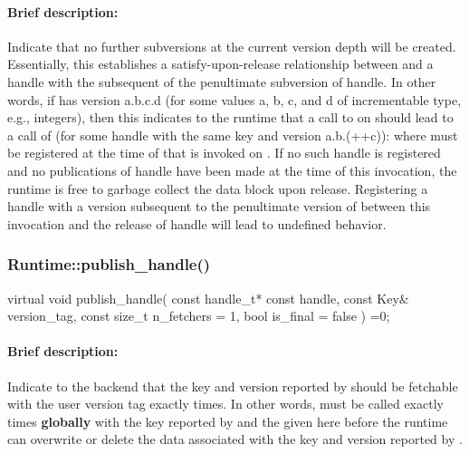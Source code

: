 \paragraph{Brief description:} Indicate that no further subversions at the current version depth will be created.
     Essentially, this establishes a satisfy-upon-release relationship between  and a handle
      with the subsequent of the penultimate subversion of handle.  In other words, if  has
       version a.b.c.d (for some values a, b, c, and d of incrementable type, e.g., integers), then this
      indicates to the runtime that a call to  on  should lead to a
       call of (for some handle  with the same key and version a.b.(++c)):
       where  must be registered at the time of that  is invoked
       on .  If no such handle is registered and no publications of handle have been made at the time
       of this invocation, the runtime is free to garbage collect the data block upon release.  Registering a
       handle with a version subsequent to the penultimate version of  between this invocation and
       the release of handle will lead to undefined behavior.


\subsubsection{Runtime::publish\_handle()}
\begin{CppCode}
    virtual void
    publish_handle(
      const handle_t* const handle,
      const Key& version_tag,
      const size_t n_fetchers = 1,
      bool is_final = false
    ) =0;
\end{CppCode}

\paragraph{Brief description:} Indicate to the backend that the key and version reported by  should be fetchable
       with the user version tag  exactly  times.
       In other words,  must be called exactly  times
       {\bf globally} with the key reported by  and the  given here before the runtime
       can overwrite or delete the data associated with the key and version reported by .

